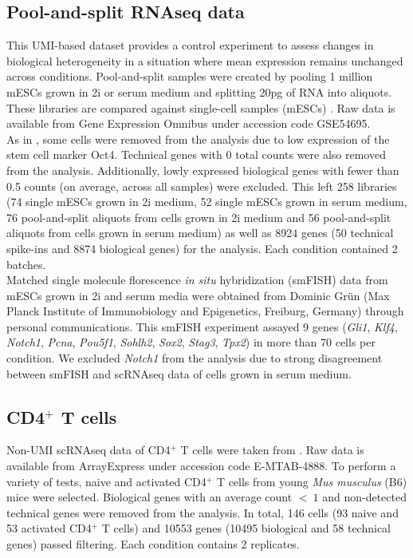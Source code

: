 \subsection{Pool-and-split RNAseq data} \label{seq::data_PaS}

This UMI-based dataset provides a control experiment to assess changes in biological heterogeneity in a situation where mean expression remains unchanged across conditions. Pool-and-split samples were created by pooling 1 million mESCs grown in 2i or serum medium and splitting 20pg of RNA into aliquots. These libraries are compared against single-cell samples (mESCs) \citep{Grun2014}. Raw data is available from Gene Expression Omnibus under accession code GSE54695. \\

As in \cite{Grun2014}, some cells were removed from the analysis due to low expression of the stem cell marker Oct4. Technical genes with 0 total counts were also removed from the analysis. Additionally, lowly expressed biological genes with fewer than 0.5 counts (on average, across all samples) were excluded. This left 258 libraries (74 single mESCs grown in 2i medium, 52 single mESCs grown in serum medium, 76 pool-and-split aliquots from cells grown in 2i medium and 56 pool-and-split aliquots from cells grown in serum medium) as well as 8924 genes (50 technical spike-ins and 8874 biological genes) for the analysis. Each condition contained 2 batches.\\

Matched single molecule florescence \textit{in situ} hybridization (smFISH) data from mESCs grown in 2i and serum media were obtained from Dominic Gr\"un (Max Planck Institute of Immunobiology and Epigenetics, Freiburg, Germany) through personal communications. This smFISH experiment assayed 9 genes (\textit{Gli1}, \textit{Klf4}, \textit{Notch1}, \textit{Pcna}, \textit{Pou5f1}, \textit{Sohlh2}, \textit{Sox2}, \textit{Stag3}, \textit{Tpx2}) in more than 70 cells per condition. We excluded \textit{Notch1} from the analysis due to strong disagreement between smFISH and scRNAseq data of cells grown in serum medium.

\subsection{CD4$^+$ T cells} \label{seq::data_cd4}

Non-UMI scRNAseq data of CD4$^+$ T cells were taken from \cite{Martinez-jimenez2017}. Raw data is available from ArrayExpress under accession code E-MTAB-4888. To perform a variety of tests, naive and activated CD4$^+$ T cells from young \emph{Mus musculus} (B6) mice were selected. Biological genes with an average count $<~1$ and non-detected technical genes were removed from the analysis. In total, 146 cells (93 naive and 53 activated CD4$^+$ T cells) and 10553 genes (10495 biological and 58 technical genes) passed filtering. Each condition contains 2 replicates.

